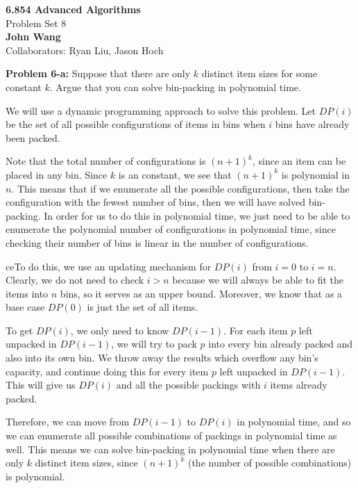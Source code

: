 \documentclass[psamsfonts]{amsart}
\newenvironment{sol}{\vspace{0.25cm}{\large \bfseries Solution:}}{\qedsymbol}
\newenvironment{prob}[1]{\begin{framed}{\large \bfseries Problem #1:}}{\end{framed}}
\newcommand{\makenewtitle}{
    \begin{center}
    {\huge \bfseries 6.854 Advanced Algorithms} \\
    Problem Set 8\\
    \vspace{0.25cm}
    {\bfseries John Wang} \\
    Collaborators: Ryan Liu, Jason Hoch 
    \end{center}
    \vspace{0.5cm}
}
\begin{document}
\newpage
\makenewtitle
 
\begin{prob}{6-a}
Suppose that there are only $k$ distinct item sizes for some constant $k$. Argue that you can solve bin-packing in polynomial time.
\end{prob}
\begin{sol}
We will use a dynamic programming approach to solve this problem. Let $DP(i)$ be the set of all possible configurations of items in bins when $i$ bins have already been packed. 

Note that the total number of configurations is $(n+1)^k$, since an item can be placed in any bin. Since $k$ is an constant, we see that $(n+1)^k$ is polynomial in $n$. This means that if we enumerate all the possible configurations, then take the configuration with the fewest number of bins, then we will have solved bin-packing. In order for us to do this in polynomial time, we just need to be able to enumerate the polynomial number of configurations in polynomial time, since checking their number of bins is linear in the number of configurations.

ceTo do this, we use an updating mechanism for $DP(i)$ from $i=0$ to $i=n$. Clearly, we do not need to check $i > n$ because we will always be able to fit the items into $n$ bins, so it serves as an upper bound. Moreover, we know that as a base case $DP(0)$ is just the set of all items. 

To get $DP(i)$, we only need to know $DP(i-1)$. For each item $p$ left unpacked in $DP(i-1)$, we will try to pack $p$ into every bin already packed and also into its own bin. We throw away the results which overflow any bin's capacity, and continue doing this for every item $p$ left unpacked in $DP(i-1)$. This will give us $DP(i)$ and all the possible packings with $i$ items already packed.

Therefore, we can move from $DP(i-1)$ to $DP(i)$ in polynomial time, and so we can enumerate all possible combinations of packings in polynomial time as well. This means we can solve bin-packing in polynomial time when there are only $k$ distinct item sizes, since $(n+1)^k$ (the number of possible combinations) is polynomial.
\end{sol}
\end{document}
